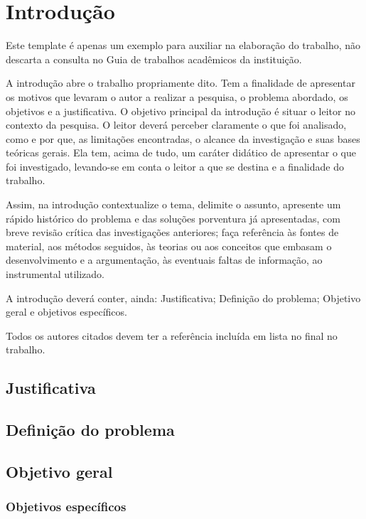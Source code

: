 \chapter{Introdução}

Este template é apenas um exemplo para auxiliar na elaboração do trabalho, não descarta a consulta no Guia de trabalhos acadêmicos da instituição.

A introdução abre o trabalho propriamente dito. Tem a finalidade de apresentar os motivos que levaram o autor a realizar a pesquisa, o problema abordado, os objetivos e a justificativa. O objetivo principal da introdução é situar o leitor no contexto da pesquisa. O leitor deverá perceber claramente o que foi analisado, como e por que, as limitações encontradas, o alcance da investigação e suas bases teóricas gerais. Ela tem, acima de tudo, um caráter didático de apresentar o que foi investigado, levando-se em conta o leitor a que se destina e a finalidade do trabalho.

Assim, na introdução contextualize o tema, delimite o assunto, apresente um rápido histórico do problema e das soluções porventura já apresentadas, com breve revisão crítica das investigações anteriores; faça referência às fontes de material, aos métodos seguidos, às teorias ou aos conceitos que embasam o desenvolvimento e a argumentação, às eventuais faltas de informação, ao instrumental utilizado.

A introdução deverá conter, ainda: Justificativa; Definição do problema; Objetivo geral e objetivos específicos.

Todos os autores citados devem ter a referência incluída em lista no final no trabalho. \cite{de2011associaccao}

\section{Justificativa}

\section{Definição do problema}

\section{Objetivo geral}

\subsection{Objetivos específicos}
